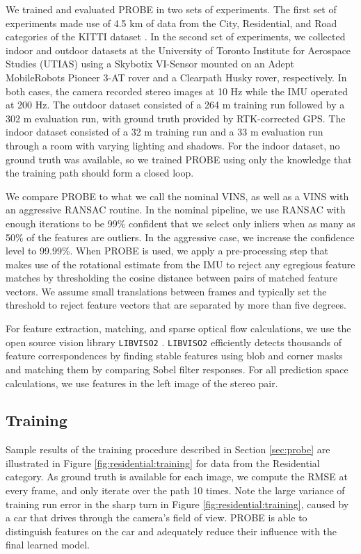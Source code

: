 \documentclass[letterpaper, 10 pt, conference]{ieeeconf}  %
\begin{document}
We trained and evaluated PROBE in two sets of experiments.
The first set of experiments made use of 4.5 km of data from the City, Residential, and Road categories of the KITTI dataset \cite{Geiger:2013kp}.
In the second set of experiments, we collected indoor and outdoor datasets at the University of Toronto Institute for Aerospace Studies (UTIAS) using a Skybotix VI-Sensor mounted on an Adept MobileRobots Pioneer 3-AT rover and a Clearpath Husky rover, respectively.
In both cases, the camera recorded stereo images at 10 Hz while the IMU operated at 200 Hz.
The outdoor dataset consisted of a 264 m training run followed by a 302 m evaluation run, with ground truth provided by RTK-corrected GPS.
The indoor dataset consisted of a 32 m training run and a 33 m evaluation run through a room with varying lighting and shadows.
For the indoor dataset, no ground truth was available, so we trained PROBE using only the knowledge that the training path should form a closed loop.

We compare PROBE to what we call the nominal VINS, as well as a VINS with an aggressive RANSAC routine. In the nominal pipeline, we use RANSAC with enough iterations to be 99\% confident that we select only inliers when as many as 50\% of the features are outliers. In the aggressive case, we increase the confidence level to 99.99\%. When PROBE is used, we apply a pre-processing step that makes use of the rotational estimate from the IMU to reject any egregious feature matches by thresholding the cosine distance between pairs of matched feature vectors. We assume small translations between frames and typically set the threshold to reject feature vectors that are separated by more than five degrees. 

For feature extraction, matching, and sparse optical flow calculations, we use the open source vision library \texttt{LIBVISO2} \cite{Geiger:2011jb}.
\texttt{LIBVISO2} efficiently detects thousands of feature correspondences by finding stable features using blob and corner masks and matching them by comparing Sobel filter responses.
For all prediction space calculations, we use features in the left image of the stereo pair.

\subsection{Training}
Sample results of the training procedure described in Section \ref{sec:probe} are illustrated in Figure \ref{fig:residential:training} for data from the Residential category.
As ground truth is available for each image, we compute the RMSE at every frame, and only iterate over the path 10 times. Note the large variance of training run error in the sharp turn in Figure \ref{fig:residential:training}, caused by a car that drives through the camera's field of view. PROBE is able to distinguish features on the car and adequately reduce their influence with the final learned model.
\end{document}
